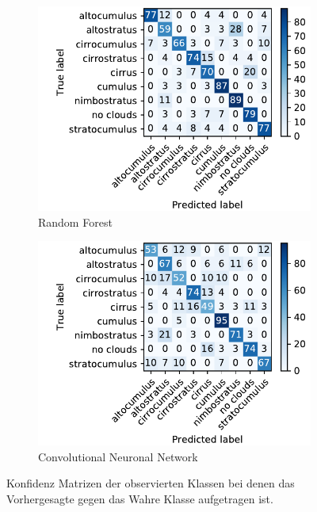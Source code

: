 \begin{figure}[h]
		\centering
		\begin{subfigure}[b]{0.49\textwidth}
				\begin{center}
						\includegraphics[width=\textwidth]{./pictures/conf_rf.pdf}
				\end{center}
				\caption{Random Forest}
				\label{fig:conf_rf}
		\end{subfigure}
		\begin{subfigure}[b]{0.49\textwidth}
				\begin{center}
						\includegraphics[width=\textwidth]{./pictures/conf_nn.pdf}
				\end{center}
				\caption{Convolutional Neuronal Network}
				\label{fig:conf_cnn}
		\end{subfigure}
		\caption{Konfidenz Matrizen der observierten Klassen bei denen das
		Vorhergesagte gegen das Wahre Klasse aufgetragen ist.}
		\label{fig:conf}
\end{figure}
